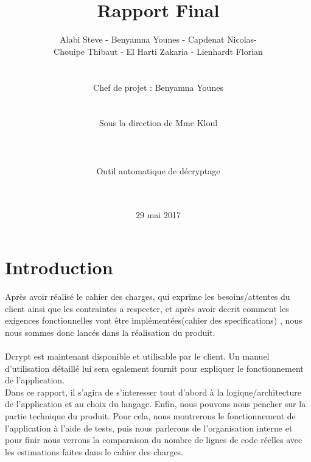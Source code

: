 \documentclass[a4]{article}
\begin{document}
	\title{\Huge{\textbf{Rapport Final}}}
	\author{Alabi Steve - Benyamna Younes - Capdenat Nicolas- \\
		Chouipe Thibaut - El Harti Zakaria - Lienhardt Florian \\ \\ \\
		Chef de projet : Benyamna Younes \\ \\ \\ 
		Sous la direction de Mme Kloul \\ \\ \\ \\
		Outil automatique de décryptage \\ \\ \\}
	\date{29 mai 2017}
		

	\begin{titlepage}
		\maketitle
		\vspace{20em}
	\end{titlepage}
	\section{Introduction}
Après avoir réalisé le cahier des charges, qui exprime les besoins/attentes du client ainsi que
les contraintes a respecter, et après avoir decrit comment les exigences fonctionnelles vont être implémentées(cahier des specifications)
, nous nous sommes donc lancés dans la réalisation du produit. \\ \\
Dcrypt est maintenant disponible et utilisable par le client. Un manuel d'utilisation
détaillé lui sera egalement fournit pour expliquer le fonctionnement de l'application.\\

Dans ce rapport, il s'agira de s'interesser tout d'abord à la logique/architecture de l'application et au choix du langage.
Enfin, nous pouvons nous pencher sur la partie technique du produit.
Pour cela, nous montrerons le fonctionnement de l'application à l'aide de tests, puis nous parlerons de l'organisation interne
 et pour finir nous verrons la comparaison du nombre de lignes de code réelles avec les estimations faites dans le cahier des charges.
\end{document}
